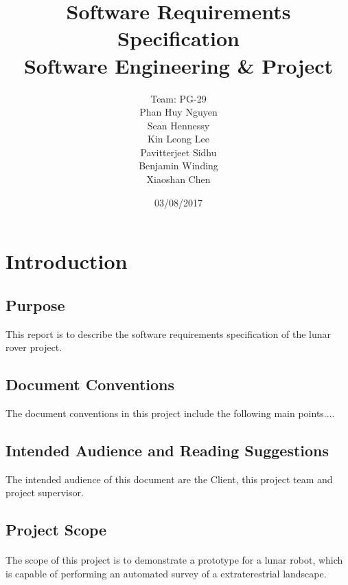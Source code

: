 \documentclass[10pt,a4paper,titlepage]{article}
\begin{document}
	
	\begin{titlepage}
		
	\title{
		\Huge Software Requirements Specification \\
		\large Software Engineering \& Project
		}
	\date{03/08/2017}
	\author{
		Team: PG-29 \\
		Phan Huy Nguyen \\
		Sean Hennessy \\
		Kin Leong Lee \\
		Pavitterjeet Sidhu \\
		Benjamin Winding \\
		Xiaoshan Chen \\
	}
	\maketitle
	
	\end{titlepage}
	
	\tableofcontents
	\newpage
	\section{Introduction}
	\subsection{Purpose}
This report is to describe the software requirements specification of the lunar rover project.

	\subsection{Document Conventions}
The document conventions in this project include the following main points....

	\subsection{Intended Audience and Reading Suggestions}
The intended audience of this document are the Client, this project team and project supervisor.

	\subsection{Project Scope}
	\paragraph{}
The scope of this project is to demonstrate a prototype for a lunar robot, which is capable of performing an automated survey of a extraterestrial landscape.
\end{document}
